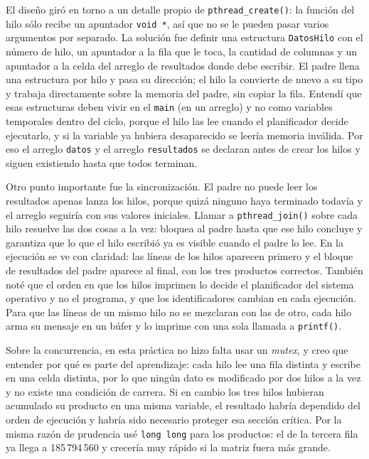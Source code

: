 El diseño giró en torno a un detalle propio de \texttt{pthread\_create()}: la función del hilo sólo recibe un apuntador \texttt{void *}, así que no se le pueden pasar varios argumentos por separado. La solución fue definir una estructura \texttt{DatosHilo} con el número de hilo, un apuntador a la fila que le toca, la cantidad de columnas y un apuntador a la celda del arreglo de resultados donde debe escribir. El padre llena una estructura por hilo y pasa su dirección; el hilo la convierte de nuevo a su tipo y trabaja directamente sobre la memoria del padre, sin copiar la fila. Entendí que esas estructuras deben vivir en el \texttt{main} (en un arreglo) y no como variables temporales dentro del ciclo, porque el hilo las lee cuando el planificador decide ejecutarlo, y si la variable ya hubiera desaparecido se leería memoria inválida. Por eso el arreglo \texttt{datos} y el arreglo \texttt{resultados} se declaran antes de crear los hilos y siguen existiendo hasta que todos terminan.

Otro punto importante fue la sincronización. El padre no puede leer los resultados apenas lanza los hilos, porque quizá ninguno haya terminado todavía y el arreglo seguiría con sus valores iniciales. Llamar a \texttt{pthread\_join()} sobre cada hilo resuelve las dos cosas a la vez: bloquea al padre hasta que ese hilo concluye y garantiza que lo que el hilo escribió ya es visible cuando el padre lo lee. En la ejecución se ve con claridad: las líneas de los hilos aparecen primero y el bloque de resultados del padre aparece al final, con los tres productos correctos. También noté que el orden en que los hilos imprimen lo decide el planificador del sistema operativo y no el programa, y que los identificadores cambian en cada ejecución. Para que las líneas de un mismo hilo no se mezclaran con las de otro, cada hilo arma su mensaje en un búfer y lo imprime con una sola llamada a \texttt{printf()}.

Sobre la concurrencia, en esta práctica no hizo falta usar un \emph{mutex}, y creo que entender por qué es parte del aprendizaje: cada hilo lee una fila distinta y escribe en una celda distinta, por lo que ningún dato es modificado por dos hilos a la vez y no existe una condición de carrera. Si en cambio los tres hilos hubieran acumulado su producto en una misma variable, el resultado habría dependido del orden de ejecución y habría sido necesario proteger esa sección crítica. Por la misma razón de prudencia usé \texttt{long long} para los productos: el de la tercera fila ya llega a 185\,794\,560 y crecería muy rápido si la matriz fuera más grande.

